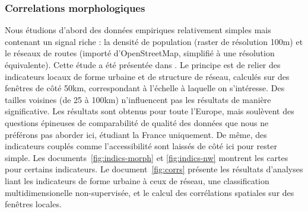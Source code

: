 \subsubsection{Correlations morphologiques}


Nous étudions d'abord des données empiriques relativement simples mais contenant un signal riche : la densité de population (raster de résolution 100m) et le réseaux de routes (importé d'OpenStreetMap, simplifié à une résolution équivalente). Cette étude a été présentée dans \cite{raimbault2016cautious}. Le principe est de relier des indicateurs locaux de forme urbaine et de structure de réseau, calculés sur des fenêtres de côté 50km, correspondant à l'échelle à laquelle on s'intéresse. Des tailles voisines (de 25 à 100km) n'influencent pas les résultats de manière significative. Les résultats sont obtenus pour toute l'Europe, mais soulèvent des questions épineuses de comparabilité de qualité des données que nous ne préférons pas aborder ici, étudiant la France uniquement. De même, des indicateurs couplés comme l'accessibilité sont laissés de côté ici pour rester simple. Les documents~\ref{fig:indics-morph} et \ref{fig:indics-nw} montrent les cartes pour certains indicateurs. Le document~\ref{fig:corrs} présente les résultats d'analyses liant les indicateurs de forme urbaine à ceux de réseau, une classification multidimensionelle non-supervisée, et le calcul des corrélations spatiales sur des fenêtres locales.

\medskip


\medskip


\medskip


\medskip



